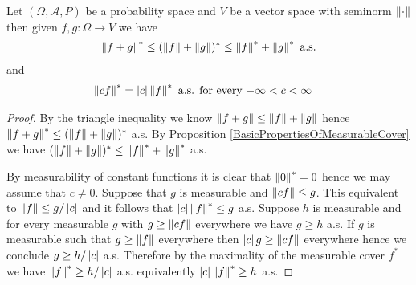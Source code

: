 \begin{lem}Let $(\Omega, \mathcal{A}, P)$  be a probability space  and $V$ be a vector space with seminorm $\norm{\cdot}$ then given $f,g : \Omega \to V$ we have
\begin{align*}
\norm{f+g}^* \leq (\norm{f}+\norm{g})^* \leq \norm{f}^* + \norm{g}^* \text{ a.s.}
\end{align*}
and
\begin{align*}
\norm{c f}^* &= \abs{c} \norm{f}^* \text{ a.s. for every $-\infty < c < \infty$}
\end{align*}
\end{lem}
\begin{proof}
By the triangle inequality we know $\norm{f+g} \leq \norm{f}+\norm{g}$ hence $\norm{f+g}^* \leq (\norm{f}+\norm{g})^*$ a.s.  By Proposition \ref{BasicPropertiesOfMeasurableCover} we have $ (\norm{f}+\norm{g})^* \leq \norm{f}^* + \norm{g}^*$ a.s.

By measurability of constant functions it is clear that $\norm{0}^* = 0$ hence we may assume that $c \neq 0$.  Suppose that $g$ is measurable and $\norm{cf} \leq g$.  This equivalent to $\norm{f} \leq g/\abs{c}$ and it follows that $\abs{c} \norm{f}^* \leq g$ a.s.  Suppose $h$ is measurable and for every measurable $g$ with $g \geq \norm{cf}$ everywhere we have $g \geq h$ a.s.   If $g$ is measurable such that $g \geq \norm{f}$ everywhere then $\abs{c} g \geq \norm{c f}$ everywhere hence we conclude $g \geq h/\abs{c}$ a.s. Therefore by the maximality of the measurable cover $f^*$ we have $\norm{f}^* \geq h/\abs{c}$ a.s. equivalently $\abs{c}\norm{f}^* \geq h$ a.s.
\end{proof}

